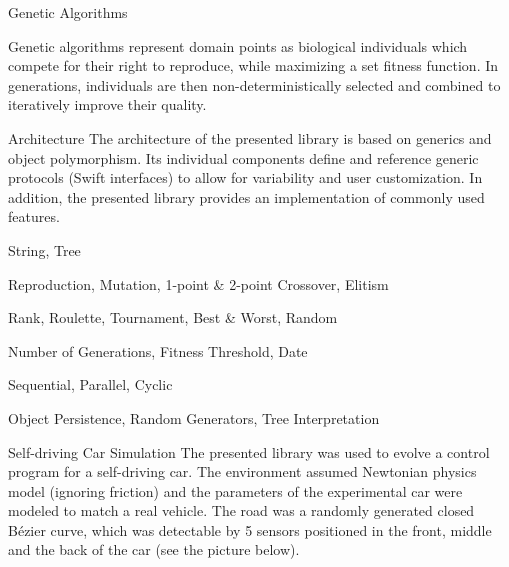 \documentclass[a0paper,portrait]{baposter}
\newcommand{\compresslist}{
	\setlength{\itemsep}{1pt}
	\setlength{\parskip}{0pt}
	\setlength{\parsep}{0pt}
}
\begin{document}
\begin{poster}
\begin{posterbox}[name=intro-ga,column=0,below=objectives]{Genetic Algorithms}
	\vspace{-0.5em}

	Genetic algorithms represent domain points as biological individuals which compete for their right to reproduce, while maximizing a set fitness function. In generations, individuals are then non-deterministically selected and combined to iteratively improve their quality.
\end{posterbox}

\begin{posterbox}[name=arch,column=1]{Architecture}
	The architecture of the presented library is based on generics and object polymorphism. Its individual components define and reference generic protocols (Swift interfaces) to allow for variability and user customization. In addition, the presented library provides an implementation of commonly used features.

	\vspace{-0.5em}

	\begin{description}
		\compresslist
		\item[Chromosomes (Genotypes):] String, Tree
		\item[Operators:] Reproduction, Mutation, 1-point \& 2-point Crossover, Elitism
		\item[Selection Methods:] Rank, Roulette, Tournament, Best \& Worst, Random
		\item[Termination Conditions:] Number of Generations, Fitness Threshold, Date
		\item[Evaluators:] Sequential, Parallel, Cyclic
		\item[Miscellaneous:] Object Persistence, Random Generators, Tree Interpretation
	\end{description}

\end{posterbox}

\begin{posterbox}[name=car,column=1,below=arch]{Self-driving Car Simulation}
	The presented library was used to evolve a control program for a self-driving car. The environment assumed Newtonian physics model (ignoring friction) and the parameters of the experimental car were modeled to match a real vehicle. The road was a randomly generated \cite{MelkmanConvexHull,CatmullRomSplines} closed Bézier curve, which was detectable by 5 sensors positioned in the front, middle and the back of the car (see the picture below).

	\vspace{0.5em}


\end{posterbox}
\end{poster}
\end{document}
